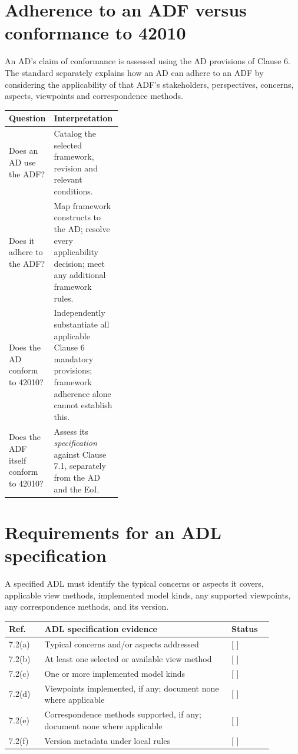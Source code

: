 \documentclass[11pt,letterpaper]{article}
\begin{document}
\section{Adherence to an ADF versus conformance to 42010}
\begin{Requirement}\FlagReq{} An AD's claim of conformance is assessed using the AD provisions of Clause 6. The standard separately explains how an AD can adhere to an ADF by considering the applicability of that ADF's stakeholders, perspectives, concerns, aspects, viewpoints and correspondence methods. \end{Requirement}
\begin{tabularx}{\linewidth}{p{0.38\linewidth}X}\toprule\textbf{Question}&\textbf{Interpretation}\\\midrule
Does an AD use the ADF?&Catalog the selected framework, revision and relevant conditions.\\
Does it adhere to the ADF?&Map framework constructs to the AD; resolve every applicability decision; meet any additional framework rules.\\
Does the AD conform to 42010?&Independently substantiate all applicable Clause 6 mandatory provisions; framework adherence alone cannot establish this.\\
Does the ADF itself conform to 42010?&Assess its \emph{specification} against Clause 7.1, separately from the AD and the EoI.\\\bottomrule\end{tabularx}
\section{Requirements for an ADL specification}
\begin{Requirement}\FlagReq{} A specified ADL must identify the typical concerns or aspects it covers, applicable view methods, implemented model kinds, any supported viewpoints, any correspondence methods, and its version. \end{Requirement}
\begin{longtable}{p{0.12\linewidth}p{0.63\linewidth}p{0.14\linewidth}}\toprule\textbf{Ref.}&\textbf{ADL specification evidence}&\textbf{Status}\\\midrule\endhead
7.2(a)&Typical concerns and/or aspects addressed&[ ]\\
7.2(b)&At least one selected or available view method&[ ]\\
7.2(c)&One or more implemented model kinds&[ ]\\
7.2(d)&Viewpoints implemented, if any; document none where applicable&[ ]\\
7.2(e)&Correspondence methods supported, if any; document none where applicable&[ ]\\
7.2(f)&Version metadata under local rules&[ ]\\\bottomrule\end{longtable}
\end{document}
